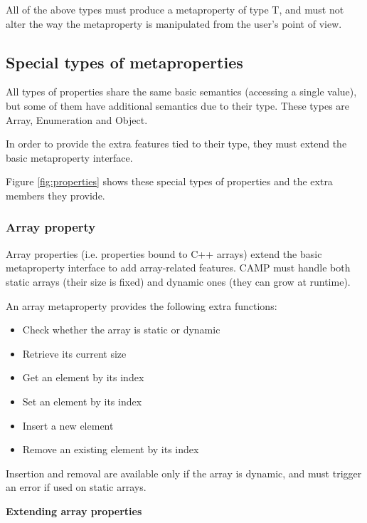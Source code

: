\documentclass[a4paper, twoside]{report}
\begin{document}
	All of the above types must produce a metaproperty of type T, and must not
	alter the way the metaproperty is manipulated from the user's point of view.

\subsection{Special types of metaproperties}
\label{sec:metaproperty-derived}
	
	All types of properties share the same basic semantics (accessing a single value), but some of them have
	additional semantics due to their type. These types are Array, Enumeration and Object.
	
	In order to provide the extra features tied to their type, they must extend the basic metaproperty interface.

	Figure \ref{fig:properties} shows these special types of properties and the extra members they provide.


\subsubsection{Array property}
\label{sec:metaproperty-array}

	Array properties (i.e. properties bound to C++ arrays) extend the basic metaproperty interface
	to add array-related features. CAMP must handle both static arrays (their size is fixed)
	and dynamic ones (they can grow at runtime).
	
	An array metaproperty provides the following extra functions:

	\begin{itemize}
		\item Check whether the array is static or dynamic
		\item Retrieve its current size
		\item Get an element by its index
		\item Set an element by its index
		\item Insert a new element
		\item Remove an existing element by its index
	\end{itemize}
	
	Insertion and removal are available only if the array is dynamic, and must trigger an error if used on static arrays.

\par{\textbf{Extending array properties}}
\end{document}
